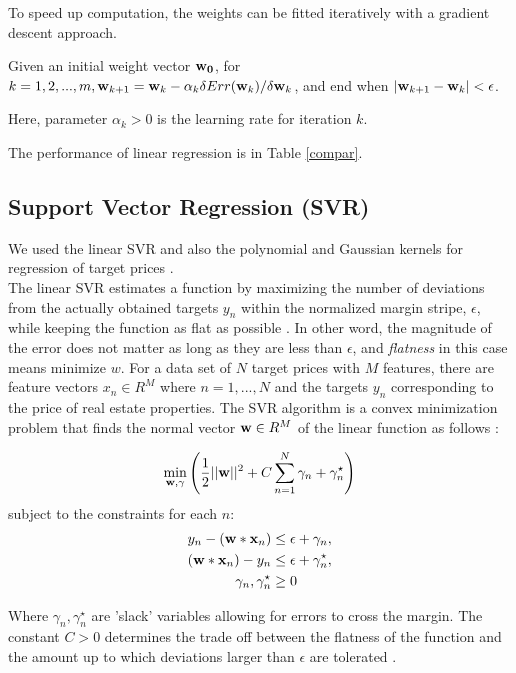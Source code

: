 \documentclass[conference]{IEEEtran}
\begin{document}
To speed up computation, the weights can be fitted iteratively with a gradient descent approach.

Given an initial weight vector $\bold{w_0}$, for $k=1,2,...,m, \bold{w}_{k+1}=\bold{w}_k-\alpha_k \delta Err(\bold{w}_k)/\delta \bold{w}_k$, and end when $|\bold{w}_{k+1}-\bold{w}_k|< \epsilon$.

Here, parameter $\alpha_k>0$ is the learning rate for iteration $k$.

The performance of linear regression is in Table \ref{compar}.

\subsection{Support Vector Regression (SVR)}
We used the linear SVR and also the polynomial and Gaussian kernels for regression of target prices \cite{Cortes:1995:SN:218919.218929,bishop2006pattern}.\\
The linear SVR estimates a function by maximizing the number of deviations from the actually obtained targets $y_n$ within the normalized margin stripe, $\epsilon$, while keeping the function as flat as possible \cite{Vapnik:1995:NSL:211359}. In other word, the magnitude of the error does not matter as long as they are less than $\epsilon$, and \textit{flatness} in this case means minimize $w$. For a data set of $N$ target prices with $M$ features, there are feature vectors $x_n \in R^M$ where $n=1,...,N$ and the targets $y_n$ corresponding to the price of real estate properties. The SVR algorithm is a convex minimization problem that finds the normal vector $\bold{w}\in R^M$ of the linear function as follows \cite{Smola:2004:TSV:1011935.1011939}:

\begin{align*}
\underset{\bold{w},\gamma}{\operatorname{min}} \left(\frac{1}{2}||\bold{w}||^2 + C \sum\limits_{n=1}^N\gamma_n+\gamma_n^\star\right)
\end{align*}
subject to the constraints for each $n$:
\begin{align*}
y_n - \left( \bold{w}*\bold{x}_n \right) &\leq \epsilon+\gamma_n,\\
\left( \bold{w}*\bold{x}_n \right)-y_n &\leq \epsilon+\gamma_n^\star, \\ \gamma_n,\gamma_n^\star &\geq 0
\end{align*}

Where $\gamma_n, \gamma_n^\star$ are 'slack' variables allowing for errors to cross the margin. The constant $C>0$ determines the trade off between the flatness of the function and the amount up to which deviations larger than $\epsilon$ are tolerated \cite{Bennett92robustlinear}.
\end{document}

